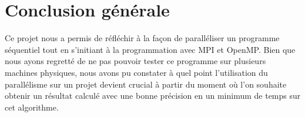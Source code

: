 \documentclass[a4paper,10pt]{article}
\begin{document}
\newpage
\section{Conclusion générale}
Ce projet nous a permis de réfléchir à la façon de paralléliser un programme séquentiel tout en s'initiant à la programmation avec MPI et OpenMP. 
Bien que nous ayons regretté de ne pas pouvoir tester ce programme 
sur plusieurs machines physiques, nous avons pu constater 
à quel point l'utilisation du parallélisme sur un projet 
devient crucial à partir du moment où l'on souhaite obtenir un résultat calculé
avec une bonne précision en un minimum de temps sur cet algorithme. 
\end{document}

